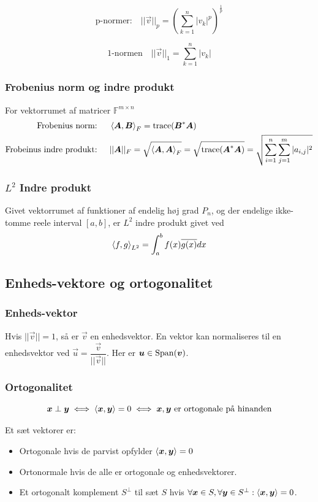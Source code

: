 \[
\text{p-normer:} \quad
|| \vec v ||_p = \left( \sum_{k=1}^n |v_k|^p \right)^{\frac{1}{p}}
\]

\[
\text{1-normen} \quad
|| \vec v ||_1 = \sum_{k=1}^n |v_k|
\]

\subsubsection{Frobenius norm og indre produkt}
For vektorrumet af matricer $\mathbb F^{m \times n}$
\begin{align*}
    \text{Frobenius norm: } \quad&
    \left \langle \boldsymbol{A}, \boldsymbol{B} \right \rangle_F 
    = \text{trace}(\boldsymbol{B}^* \boldsymbol{A}) \\
    \text{Frobeinus indre produkt: } \quad&
    ||\boldsymbol{A}||_F 
    = \sqrt{\left \langle \boldsymbol{A}, \boldsymbol{A} \right \rangle_F} 
    = \sqrt{\text{trace}(\boldsymbol{A}^* \boldsymbol{A})} 
    = \sqrt{\sum_{i=1}^n \sum_{j=1}^m |a_{i,j}|^2}
\end{align*}

\subsubsection{$L^2$ Indre produkt}
Givet vektorrumet af funktioner af endelig høj grad $P_n$, og der endelige ikke-tomme reele interval $[a, b]$, er $L^2$ indre produkt givet ved
\[
\left \langle f, g \right \rangle_{L^2} = \int_a^b f(x) \overline{g(x)} dx
\]

\subsection{Enheds-vektore og ortogonalitet}
\subsubsection{Enheds-vektor}
\label{sec:enhedsvektor}
Hvis $||\vec v|| = 1$, så er $\vec v$ en enhedsvektor.
En vektor kan normaliseres til en enhedsvektor ved $\vec u = \dfrac{\vec v}{||\vec v||}$.
Her er $\boldsymbol{u} \in \operatorname{Span}(\boldsymbol{v})$.

\subsubsection{Ortogonalitet}
\label{sec:ortogonalitet}

\[
\boldsymbol{x} \perp \boldsymbol{y} 
\iff \left \langle \boldsymbol{x}, \boldsymbol{y} \right \rangle = 0 
\iff \boldsymbol{x}, \boldsymbol{y} \text{ er ortogonale på hinanden}
\]

Et sæt vektorer er:
\begin{itemize}
    \item Ortogonale hvis de parvist opfylder $\left \langle \boldsymbol{x}, \boldsymbol{y} \right \rangle = 0$
    \item Ortonormale hvis de alle er ortogonale og enhedsvektorer.
    \item Et ortogonalt komplement $S^\perp$ til sæt $S$ hvis $\forall \boldsymbol{x} \in S, \forall \boldsymbol{y} \in S^\perp : \left \langle \boldsymbol{x}, \boldsymbol{y} \right \rangle = 0$.
\end{itemize}

